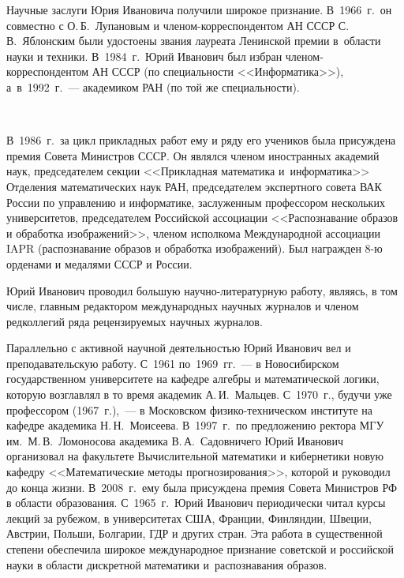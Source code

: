 Научные заслуги Юрия Ивановича получили широкое признание. В~1966~г.\ он совместно с 
О.\,Б.~Лупановым и чле\-ном-кор\-рес\-пон\-ден\-том АН СССР С.\,В.~Яблонским были удостоены 
звания лауреата Ленинской премии в~об\-ласти науки и техники. В~1984~г.\ Юрий Иванович 
был избран членом-корреспондентом АН СССР (по специальности <<Информатика>>), 
а~в~1992~г.~--- академиком РАН (по той же специальности).\linebreak\vspace*{-12pt}

\pagebreak

\

\vspace*{-46pt}

\noindent
{}

 \thispagestyle{empty}

\noindent
В~1986~г.\ за цикл прикладных 
работ ему и ряду его учеников была при\-суж\-де\-на премия Совета Министров СССР. Он являлся 
членом иностранных академий наук, председателем секции <<Прикладная математика
 и~информатика>> Отделения математических наук РАН, председателем экспертного совета ВАК 
России по управ\-ле\-нию и информатике, заслуженным профессором нескольких университетов, 
председателем Российской ассоциации <<Распознавание образов и обработка изображений>>, 
членом исполкома Международной ассоциации IAPR (распознавание образов и обработка 
изображений). Был награжден 8-ю орденами и медалями СССР и России.

Юрий Иванович проводил большую научно-литературную работу, являясь, в том числе, главным 
редактором международных научных журналов и членом редколлегий ряда рецензируемых 
научных журналов. 


Параллельно с активной научной деятельностью Юрий Иванович вел и преподавательскую 
работу. С~1961 по~1969~гг.~--- в Новосибирском государственном университете на кафедре 
алгебры и математической логики, которую возглавлял в то время академик А.\,И.~Мальцев. 
С~1970~г., будучи уже профессором (1967~г.),~--- в Московском физико-техническом институте 
на кафедре академика Н.\,Н.~Моисеева. В~1997~г.\ по предложению ректора МГУ им.\ 
М.\,В.~Ломоносова академика В.\,А.~Садовничего Юрий Иванович организовал на факультете 
Вычислительной математики и кибернетики новую кафедру <<Математические методы 
прогнозирования>>, которой и руководил до конца жизни. В~2008~г.\ ему была присуждена 
премия Совета Министров РФ в области образования. С~1965~г.\ Юрий Иванович периодически 
читал курсы лекций за рубежом, в университетах США, Франции, Финляндии, Швеции, Австрии, 
Польши, Болгарии, ГДР и других стран. Эта работа в существенной степени обеспечила широкое 
международное признание советской и российской науки в области дискретной математики и~распознавания образов. 

